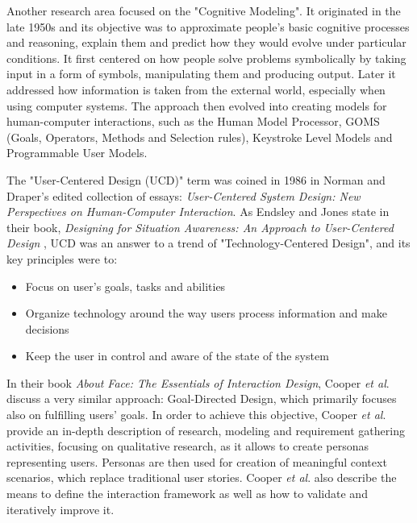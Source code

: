 \documentclass{article}
\begin{document}
Another research area focused on the "Cognitive Modeling". It originated in the late 1950s and its objective was to approximate people's basic cognitive processes and reasoning, explain them and predict how they would evolve under particular conditions. It first centered on how people solve problems symbolically by taking input in a form of symbols, manipulating them and producing output. Later it addressed how information is taken from the external world, especially when using computer systems. The approach then evolved into creating models for human-computer interactions, such as the Human Model Processor, GOMS (Goals, Operators, Methods and Selection rules), Keystroke Level Models and Programmable User Models.

The "User-Centered Design (UCD)" term was coined in 1986 in Norman and Draper's edited collection of essays: \textit{User-Centered System Design: New Perspectives on Human-Computer Interaction}. As Endsley and Jones state in their book, \textit{Designing for Situation Awareness: An Approach to User-Centered Design} \cite{endsley2016designing}, UCD was an answer to a trend of "Technology-Centered Design", and its key principles were to:
\begin{itemize}
    \item Focus on user's goals, tasks and abilities
    \item Organize technology around the way users process information and make decisions
    \item Keep the user in control and aware of the state of the system
\end{itemize}

In their book \textit{About Face: The Essentials of Interaction Design}, Cooper \textit{et al}. \cite{cooper2014face} discuss a very similar approach: Goal-Directed Design, which primarily focuses also on fulfilling users' goals. In order to achieve this objective, Cooper \textit{et al}. provide an in-depth description of research, modeling and requirement gathering activities, focusing on qualitative research, as it allows to create personas representing users. Personas are then used for creation of meaningful context scenarios, which replace traditional user stories. Cooper \textit{et al}. also describe the means to define the interaction framework as well as how to validate and iteratively improve it.
\end{document}
